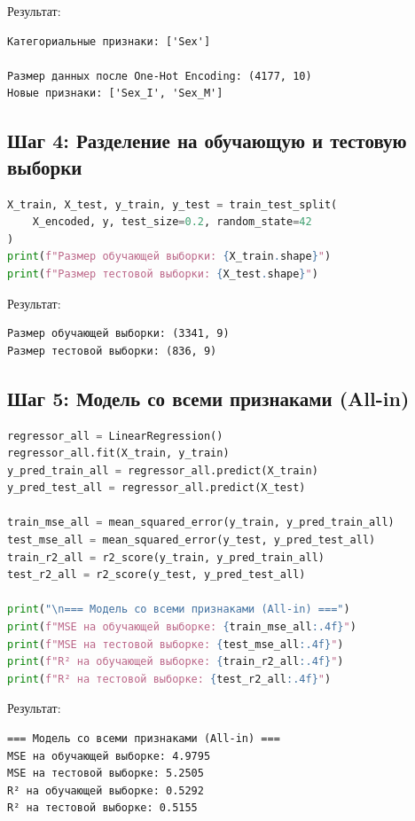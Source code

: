 Результат:

\begin{verbatim}
Категориальные признаки: ['Sex']

Размер данных после One-Hot Encoding: (4177, 10)
Новые признаки: ['Sex_I', 'Sex_M']
\end{verbatim}

\subsection{Шаг 4: Разделение на обучающую и тестовую выборки}

\begin{lstlisting}[language=Python, caption=Разделение данных]
X_train, X_test, y_train, y_test = train_test_split(
    X_encoded, y, test_size=0.2, random_state=42
)
print(f"Размер обучающей выборки: {X_train.shape}")
print(f"Размер тестовой выборки: {X_test.shape}")
\end{lstlisting}

Результат:

\begin{verbatim}
Размер обучающей выборки: (3341, 9)
Размер тестовой выборки: (836, 9)
\end{verbatim}

\subsection{Шаг 5: Модель со всеми признаками (All-in)}

\begin{lstlisting}[language=Python, caption=Обучение модели All-in]
regressor_all = LinearRegression()
regressor_all.fit(X_train, y_train)
y_pred_train_all = regressor_all.predict(X_train)
y_pred_test_all = regressor_all.predict(X_test)

train_mse_all = mean_squared_error(y_train, y_pred_train_all)
test_mse_all = mean_squared_error(y_test, y_pred_test_all)
train_r2_all = r2_score(y_train, y_pred_train_all)
test_r2_all = r2_score(y_test, y_pred_test_all)

print("\n=== Модель со всеми признаками (All-in) ===")
print(f"MSE на обучающей выборке: {train_mse_all:.4f}")
print(f"MSE на тестовой выборке: {test_mse_all:.4f}")
print(f"R² на обучающей выборке: {train_r2_all:.4f}")
print(f"R² на тестовой выборке: {test_r2_all:.4f}")
\end{lstlisting}

Результат:

\begin{verbatim}
=== Модель со всеми признаками (All-in) ===
MSE на обучающей выборке: 4.9795
MSE на тестовой выборке: 5.2505
R² на обучающей выборке: 0.5292
R² на тестовой выборке: 0.5155
\end{verbatim}

